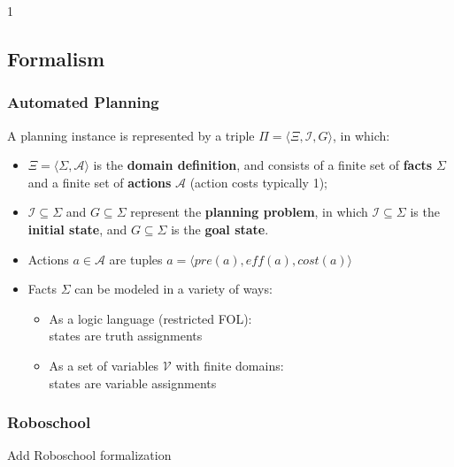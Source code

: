 \documentclass[usenames,dvipsnames]{beamer}
\newcommand{\todo}[1]{ {\color{red} #1} }
\def\masterclass{1}
\def\masterclass{0}
\begin{document}
\if\masterclass1
\subsection{Formalism}

	\begin{frame}[c]\frametitle{Automated Planning}
		\begin{definition} 
			A planning instance is represented by a triple $\Pi = \langle \Xi, \mathcal{I}, G\rangle$, in which:
			\begin{itemize}
				\item $\Xi = \langle \Sigma, \mathcal{A} \rangle$ is the \textbf{domain definition}, and consists of a finite set of \textbf{facts} $\Sigma$ and a finite set of \textbf{actions} $\mathcal{A}$ (action costs typically 1);
				\item $\mathcal{I} \subseteq \Sigma$ and $G \subseteq \Sigma$ represent the \textbf{planning problem}, in which $\mathcal{I} \subseteq \Sigma$ is the \textbf{initial state}, and $G \subseteq \Sigma$ is the \textbf{goal state}.
			\end{itemize}
		\end{definition}
		\begin{itemize}
			\item Actions $a \in \mathcal{A}$ are tuples $a = \langle \mathit{pre}(a), \mathit{eff}(a), \mathit{cost}(a) \rangle$
			\item Facts $\Sigma$ can be modeled in a variety of ways:
			\begin{itemize}
				\item As a logic language (restricted FOL): \\states are truth assignments
				\item As a set of variables $\mathcal{V}$ with finite domains: \\states are variable assignments
			\end{itemize}
		\end{itemize}
	\end{frame}

	\begin{frame}[c]\frametitle{Roboschool}
		{\color{red} Add Roboschool formalization}
	\end{frame}
\end{document}
